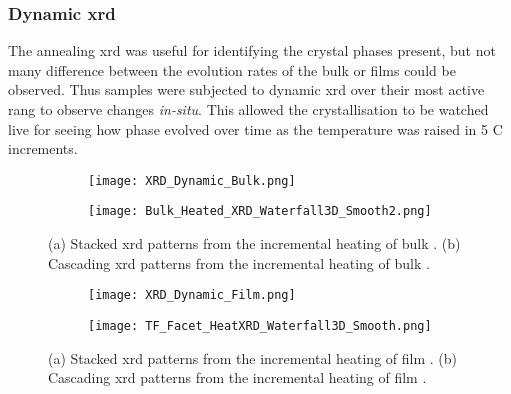 \documentclass[a4paper,12pt,oneside]{article}%
\begin{document}
\subsubsection{Dynamic \acrshort{xrd}}

The annealing \acrshort{xrd} was useful for identifying the crystal phases present, but not many difference between the evolution rates of the bulk or films could be observed. Thus samples were subjected to dynamic \acrshort{xrd} over their most active rang to observe changes \textit{in-situ}. This allowed the crystallisation to be watched live for seeing how phase evolved over time as the temperature was raised in 5 \degree C increments. 

\begin{figure}[b]
	\centering
	\begin{subfigure}[htbp]{0.75\textwidth}
		\texttt{[image: XRD\_Dynamic\_Bulk.png]}
		\caption{}
		\label{fig:XRD_Dynamic_FullStack_Bulk}
	\end{subfigure}
	\begin{subfigure}[htbp]{0.75\textwidth}
		\texttt{[image: Bulk\_Heated\_XRD\_Waterfall3D\_Smooth2.png]}
		\caption{}
		\label{fig:XRD_Dynamic_WaterFall_Bulk}
	\end{subfigure}
	\caption{(a) Stacked \gls{xrd} patterns from the incremental heating of bulk \MgZnCa. (b) Cascading \gls{xrd} patterns from the incremental heating of bulk \MgZnCa. }%
	\label{fig:XRD_Dynamic_Bulk}
\end{figure}

\begin{figure}[b]
	\centering
	\begin{subfigure}[htbp]{0.75\textwidth}
		\texttt{[image: XRD\_Dynamic\_Film.png]}
		\caption{}
		\label{fig:XRD_Dynamic_FullStack_Film}
	\end{subfigure}
	\begin{subfigure}[htbp]{0.75\textwidth}
		\texttt{[image: TF\_Facet\_HeatXRD\_Waterfall3D\_Smooth.png]}
		\caption{}
		\label{fig:XRD_Dynamic_WaterFall_Film}
	\end{subfigure}
	\caption{(a) Stacked \gls{xrd} patterns from the incremental heating of film \MgZnCa. (b) Cascading \gls{xrd} patterns from the incremental heating of film \MgZnCa. }%
	\label{fig:XRD_Dynamic_Film}
\end{figure}
\end{document}
